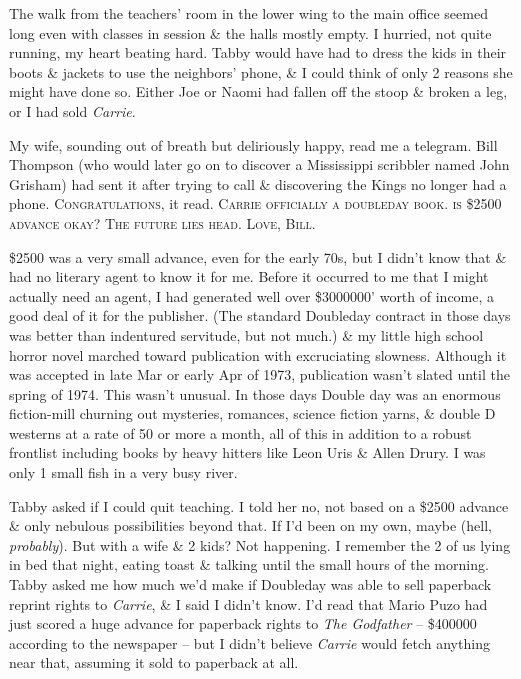 \documentclass{article}
\numberwithin{equation}{section}
\begin{document}
The walk from the teachers' room in the lower wing to the main office seemed long even with classes in session \& the halls mostly empty. I hurried, not quite running, my heart beating hard. Tabby would have had to dress the kids in their boots \& jackets to use the neighbors' phone, \& I could think of only 2 reasons she might have done so. Either Joe or Naomi had fallen off the stoop \& broken a leg, or I had sold \textit{Carrie}.

My wife, sounding out of breath but deliriously happy, read me a telegram. Bill Thompson (who would later go on to discover a Mississippi scribbler named John Grisham) had sent it after trying to call \& discovering the Kings no longer had a phone. \textsc{Congratulations}, it read. \textsc{Carrie officially a doubleday book. is \$2500 advance okay? The future lies head. Love, Bill}.

\$2500 was a very small advance, even for the early 70s, but I didn't know that \& had no literary agent to know it for me. Before it occurred to me that I might actually need an agent, I had generated well over \$3000000' worth of income, a good deal of it for the publisher. (The standard Doubleday contract in those days was better than indentured servitude, but not much.) \& my little high school horror novel marched toward publication with excruciating slowness. Although it was accepted in late Mar or early Apr of 1973, publication wasn't slated until the spring of 1974. This wasn't unusual. In those days Double day was an enormous fiction-mill churning out mysteries, romances, science fiction yarns, \& double D westerns at a rate of 50 or more a month, all of this in addition to a robust frontlist including books by heavy hitters like Leon Uris \& Allen Drury. I was only 1 small fish in a very busy river.

Tabby asked if I could quit teaching. I told her no, not based on a \$2500 advance \& only nebulous possibilities beyond that. If I'd been on my own, maybe (hell, \textit{probably}). But with a wife \& 2 kids? Not happening. I remember the 2 of us lying in bed that night, eating toast \& talking until the small hours of the morning. Tabby asked me how much we'd make if Doubleday was able to sell paperback reprint rights to \textit{Carrie}, \& I said I didn't know. I'd read that Mario Puzo had just scored a huge advance for paperback rights to \textit{The Godfather} -- \$400000 according to the newspaper -- but I didn't believe \textit{Carrie} would fetch anything near that, assuming it sold to paperback at all.
\end{document}
